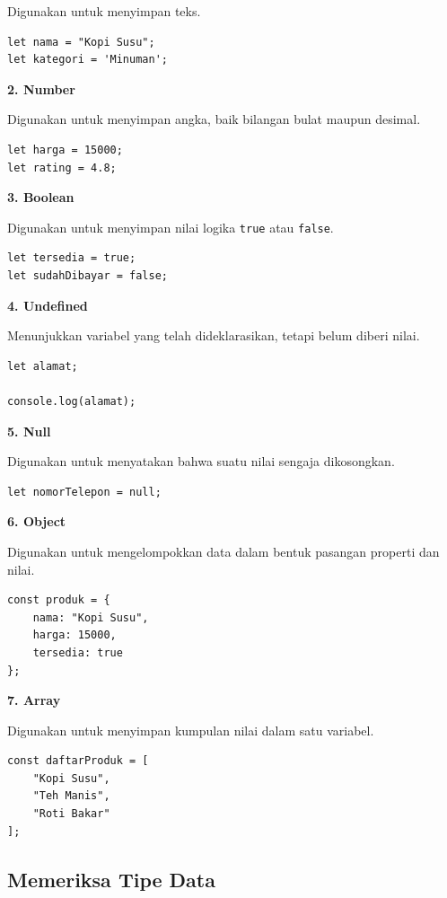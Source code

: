 \documentclass[12pt,a4paper]{article}
\begin{document}
Digunakan untuk menyimpan teks.

\begin{lstlisting}
let nama = "Kopi Susu";
let kategori = 'Minuman';
\end{lstlisting}

\textbf{2. Number}

Digunakan untuk menyimpan angka, baik bilangan
bulat maupun desimal.

\begin{lstlisting}
let harga = 15000;
let rating = 4.8;
\end{lstlisting}

\textbf{3. Boolean}

Digunakan untuk menyimpan nilai logika
\texttt{true} atau \texttt{false}.

\begin{lstlisting}
let tersedia = true;
let sudahDibayar = false;
\end{lstlisting}

\textbf{4. Undefined}

Menunjukkan variabel yang telah dideklarasikan,
tetapi belum diberi nilai.

\begin{lstlisting}
let alamat;

console.log(alamat);
\end{lstlisting}

\textbf{5. Null}

Digunakan untuk menyatakan bahwa suatu nilai
sengaja dikosongkan.

\begin{lstlisting}
let nomorTelepon = null;
\end{lstlisting}

\textbf{6. Object}

Digunakan untuk mengelompokkan data dalam bentuk
pasangan properti dan nilai.

\begin{lstlisting}
const produk = {
    nama: "Kopi Susu",
    harga: 15000,
    tersedia: true
};
\end{lstlisting}

\textbf{7. Array}

Digunakan untuk menyimpan kumpulan nilai dalam
satu variabel.

\begin{lstlisting}
const daftarProduk = [
    "Kopi Susu",
    "Teh Manis",
    "Roti Bakar"
];
\end{lstlisting}

\subsection{Memeriksa Tipe Data}
\end{document}
